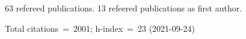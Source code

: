 63 refereed publications. 13 refeered publications as first author.

Total citations~=~2001; h-index~=~23 (2021-09-24)